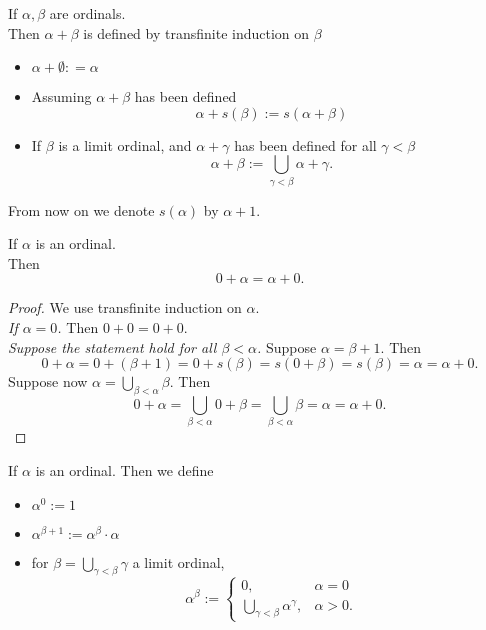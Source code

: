 \begin{definition}
    If $\alpha, \beta$ are ordinals.\\
    Then $\alpha + \beta$ is defined by transfinite induction on $\beta$
    \begin{itemize}[label=-]
        \item $\alpha + \emptyset : = \alpha$
        \item Assuming $\alpha + \beta$ has been defined
        $$\alpha + s(\beta) := s(\alpha + \beta)$$
        \item If $\beta$ is a limit ordinal, and $\alpha + \gamma$ has been defined for all $\gamma < \beta$
        $$ \alpha + \beta := \bigcup_{\gamma < \beta} \alpha + \gamma. $$
    \end{itemize}
\end{definition}

\begin{notation}
    From now on we denote $s(\alpha)$ by $\alpha + 1$.
\end{notation}

\begin{example}
    If $\alpha$ is an ordinal.\\
    Then $$ 0 + \alpha = \alpha + 0. $$
\end{example}
\begin{proof}
    We use transfinite induction on $\alpha$.\\
    \emph{If $\alpha = 0$.} Then $0 + 0 = 0 + 0$.\\
    \emph{Suppose the statement hold for all $\beta < \alpha$.} Suppose $\alpha = \beta + 1$. Then
    $$ 0 + \alpha = 0 + (\beta + 1) = 0 + s(\beta) = s(0 + \beta) = s(\beta) = \alpha = \alpha + 0.$$
    Suppose now $\alpha = \bigcup_{\beta < \alpha} \beta$. Then
    $$ 0 + \alpha = \bigcup_{\beta < \alpha} 0 + \beta = \bigcup_{\beta < \alpha} \beta = \alpha = \alpha + 0. $$
\end{proof}

\begin{definition}
    If $\alpha$ is an ordinal.
    Then we define
    \begin{itemize}
        \item $\alpha^0 := 1$
        \item $\alpha^{\beta + 1} := \alpha^\beta \cdot \alpha$
        \item for $\beta = \bigcup_{\gamma < \beta} \gamma$ a limit ordinal,
        $$ \alpha^\beta := \begin{cases}
            0, & \alpha = 0\\
            \bigcup_{\gamma < \beta} \alpha^\gamma,& \alpha > 0.
        \end{cases}$$
    \end{itemize}
\end{definition}


